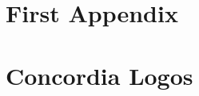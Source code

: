 \documentclass[letterpaper,12pt,onecolumn,final]{report}
\begin{document}
\clearpage
{}
{}  %
\singlespacing %





\appendix
\setcounter{table}{0}		%
\setcounter{figure}{0}		%
\renewcommand{\thefigure}{\Alph{chapter}.\arabic{figure}} 	%
\renewcommand{\thetable}{\Alph{chapter}.\arabic{table}}		%

\begin{appendices}
\doublespacing

\chapter{First Appendix}
\label{chap:apdx1}



\chapter{Concordia Logos}
\label{chap:logos}

\end{appendices}
\end{document}
